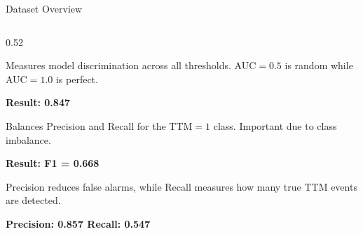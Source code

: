 \documentclass[aspectratio=169, 10pt]{beamer}
\begin{document}
\begin{frame}{Dataset Overview}
\begin{columns}[T,onlytextwidth]
\begin{column}{0.52\textwidth}
\begin{tcolorbox}[
bluecard,
title={\small AUC-ROC},
boxsep=2pt,
left=3pt,right=3pt,
top=3pt,bottom=3pt]

\footnotesize
Measures model discrimination across all thresholds.
AUC$=0.5$ is random while AUC$=1.0$ is perfect.

\textbf{Result: 0.847}

\end{tcolorbox}

\vspace{2pt}

\begin{tcolorbox}[
tealcard,
title={\small Binary F1 Score},
boxsep=2pt,
left=3pt,right=3pt,
top=3pt,bottom=3pt]

\footnotesize
Balances Precision and Recall for the TTM$=1$ class.
Important due to class imbalance.

\textbf{Result: F1 = 0.668}

\end{tcolorbox}

\vspace{2pt}

\begin{tcolorbox}[
orangecard,
title={\small Precision \& Recall},
boxsep=2pt,
left=3pt,right=3pt,
top=3pt,bottom=3pt]

\footnotesize
Precision reduces false alarms, while Recall measures how many true TTM events are detected.

\textbf{Precision: 0.857 \quad Recall: 0.547}

\end{tcolorbox}

\end{column}

\end{columns}
\end{frame}
\end{document}
